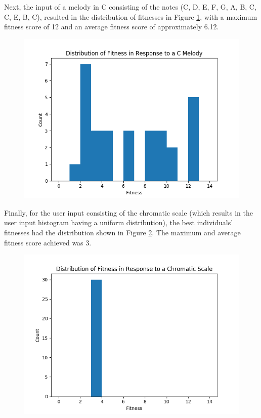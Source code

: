 \documentclass[conference]{IEEEtran}
\begin{document}
Next, the input of a melody in C consisting of the notes (C, D, E, F, G, A, B, C, C, E, B, C), resulted in the distribution of fitnesses in Figure \ref{fig:cmelodydist}, with a maximum fitness score of 12 and an average fitness score of  approximately 6.12. 


\begin{figure}[H]
	\centering
	\includegraphics[width=0.8\linewidth]{cMelodyDist}
	\caption{}
	\label{fig:cmelodydist}
\end{figure}

Finally, for the user input consisting of the chromatic scale (which results in the user input histogram having a uniform distribution), the best individuals' fitnesses had the distribution shown in Figure \ref{fig:chromaticdist}. The maximum and average fitness score achieved was 3.


\begin{figure}[H]
	\centering
	\includegraphics[width=0.8\linewidth]{chromaticDist}
	\caption{}
	\label{fig:chromaticdist}
\end{figure}
\end{document}
